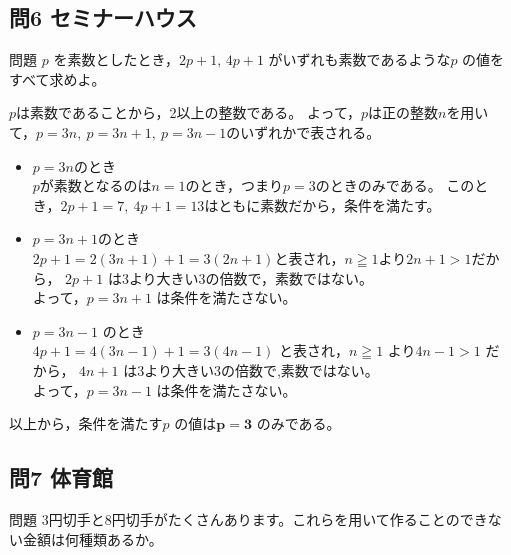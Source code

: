\documentclass[a5paper]{ltjsarticle}
\begin{document}
\subsection*{問6 セミナーハウス}
\begin{itembox}[l]{問題}
  $ p$ を素数としたとき，$ 2p+1,\, 4p+1$ がいずれも素数であるような$ p$ の値をすべて求めよ。
\end{itembox}

$p$は素数であることから，2以上の整数である。
よって，$p$は正の整数$n$を用いて，$p=3n,\: p=3n+1,\: p=3n-1$のいずれかで表される。
\begin{itemize}
  \item $p=3n$のとき\\
    $p$が素数となるのは$n=1$のとき，つまり$p=3$のときのみである。
    このとき，$2p+1=7,\: 4p+1=13$はともに素数だから，条件を満たす。
  \item $p=3n+1$のとき\\
    $2p+1=2(3n+1)+1=3(2n+1)$と表され，$n\geqq 1$より$2n+1>1$だから，
    \(2p+1\) は3より大きい3の倍数で，素数ではない。\\
    よって，\(p=3n+1\) は条件を満たさない。
  \item \(p=3n-1\) のとき\\
    \(4p+1=4(3n-1)+1=3(4n-1)\) と表され，\(n\geqq 1\) より\( 4n-1>1\) だから，
    \(4n+1\) は3より大きい3の倍数で,素数ではない。\\
    よって，\(p=3n-1\) は条件を満たさない。
\end{itemize}
以上から，条件を満たす\(p\) の値は\(\bm{p=3}\) のみである。


\subsection*{問7 体育館}
\begin{itembox}[l]{問題}
  3円切手と8円切手がたくさんあります。これらを用いて作ることのできない金額は何種類あるか。
\end{itembox}
\end{document}

